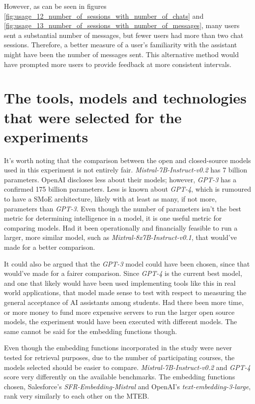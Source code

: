 However, as can be seen in figures \ref{fig:usage_12_number_of_sessions_with_number_of_chats} and \ref{fig:usage_13_number_of_sessions_with_number_of_messages}, many users sent a substantial number of messages, but fewer users had more than two chat sessions. Therefore, a better measure of a user's familiarity with the assistant might have been the number of messages sent. This alternative method would have prompted more users to provide feedback at more consistent intervals.


\section{The tools, models and technologies that were selected for the experiments}


It's worth noting that the comparison between the open and closed-source models used in this experiment is not entirely fair. \textit{Mistral-7B-Instruct-v0.2} has 7 billion parameters. OpenAI discloses less about their models; however, \textit{GPT-3} has a confirmed 175 billion parameters. Less is known about \textit{GPT-4}, which is rumoured to have a \gls{SMoE} architecture, likely with at least as many, if not more, parameters than \textit{GPT-3}. Even though the number of parameters isn’t the best metric for determining intelligence in a model, it is one useful metric for comparing models. Had it been operationally and financially feasible to run a larger, more similar model, such as \textit{Mixtral-8x7B-Instruct-v0.1}, that would’ve made for a better comparison.


It could also be argued that the \textit{GPT-3} model could have been chosen, since that would’ve made for a fairer comparison. Since \textit{GPT-4} is the current best model, and one that likely would have been used implementing tools like this in real world applications, that model made sense to test with respect to measuring the general acceptance of AI assistants among students. Had there been more time, or more money to fund more expensive servers to run the larger open source models, the experiment would have been executed with different models. The same cannot be said for the embedding functions though.


Even though the embedding functions incorporated in the study were never tested for retrieval purposes, due to the number of participating courses, the models selected should be easier to compare. \textit{Mistral-7B-Instruct-v0.2} and \textit{GPT-4} score very differently on the available benchmarks. The embedding functions chosen, Salesforce’s \textit{SFR-Embedding-Mistral} and OpenAI’s \textit{text-embedding-3-large}, rank very similarly to each other on the \gls{MTEB}.


